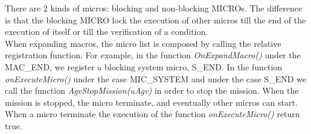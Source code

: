 There are 2 kinds of micros: blocking and non-blocking MICROs. The difference is that the blocking MICRO lock the execution of other micros till the end of the execution of itself or till the verification of a condition. \\

When expanding macros, the micro list is composed by calling the relative registration function.
For example, in the function \textit{OnExpandMacro()} under the MAC\_END, we register a blocking system micro, S\_END.
In the function \textit{onExecuteMicro()} under the case MIC\_SYSTEM and under the case S\_END we call the function \textit{AgvStopMission(uAgv)} in order to stop the mission.
When the mission is stopped, the micro terminate, and eventually other micros can start. When a micro terminate the execution of the function \textit{onExecuteMicro()} return true. \\


